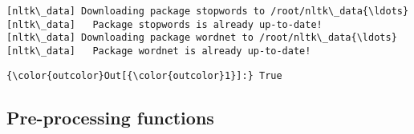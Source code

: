 \documentclass[11pt]{article}
\begin{document}
    \begin{Verbatim}[commandchars=\\\{\}]
[nltk\_data] Downloading package stopwords to /root/nltk\_data{\ldots}
[nltk\_data]   Package stopwords is already up-to-date!
[nltk\_data] Downloading package wordnet to /root/nltk\_data{\ldots}
[nltk\_data]   Package wordnet is already up-to-date!

    \end{Verbatim}

\begin{Verbatim}[commandchars=\\\{\}]
{\color{outcolor}Out[{\color{outcolor}1}]:} True
\end{Verbatim}
            
    \subsection{Pre-processing functions}\label{pre-processing-functions}
\end{document}
